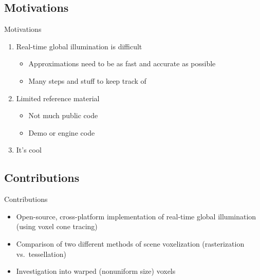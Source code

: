 \documentclass[10pt]{beamer}
\begin{document}
\subsection{Motivations}
\begin{frame}{Motivations}
  \begin{enumerate}
    \item Real-time global illumination is difficult %
      \begin{itemize}
        \item Approximations need to be as fast and accurate as possible
        \item Many steps and stuff to keep track of
      \end{itemize}
    \item Limited reference material
        \begin{itemize}
          \item Not much public code  %
          \item Demo or engine code %
        \end{itemize}
    \pause
    \item It's cool %
  \end{enumerate}
\end{frame}

\subsection{Contributions}
\begin{frame}{Contributions}
  \begin{itemize}
    \item Open-source, cross-platform implementation of real-time global illumination (using voxel cone tracing) %
    \item Comparison of two different methods of scene voxelization (rasterization vs.\ tessellation)%
    \item Investigation into warped (nonuniform size) voxels %
  \end{itemize}
\end{frame}
\end{document}
